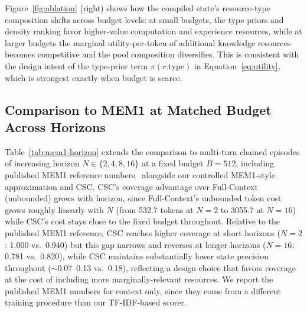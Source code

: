 \documentclass{article}
\begin{document}
Figure~\ref{fig:ablation} (right) shows how the compiled state's resource-type composition shifts across budget levels: at small budgets, the type priors and density ranking favor higher-value computation and experience resources, while at larger budgets the marginal utility-per-token of additional knowledge resources becomes competitive and the pool composition diversifies. This is consistent with the design intent of the type-prior term $\pi(r.\text{type})$ in Equation~\eqref{eq:utility}, which is strongest exactly when budget is scarce.

\subsection{Comparison to MEM1 at Matched Budget Across Horizons}
Table~\ref{tab:mem1-horizon} extends the comparison to multi-turn chained episodes of increasing horizon $N \in \{2, 4, 8, 16\}$ at a fixed budget $B=512$, including published MEM1 reference numbers~\citep{zhou2025mem1} alongside our controlled MEM1-style approximation and CSC. CSC's coverage advantage over Full-Context (unbounded) grows with horizon, since Full-Context's unbounded token cost grows roughly linearly with $N$ (from 532.7 tokens at $N=2$ to 3055.7 at $N=16$) while CSC's cost stays close to the fixed budget throughout. Relative to the published MEM1 reference, CSC reaches higher coverage at short horizons ($N=2$: 1.000 vs.\ 0.940) but this gap narrows and reverses at longer horizons ($N=16$: 0.781 vs.\ 0.820), while CSC maintains substantially lower state precision throughout ($\sim$0.07--0.13 vs.\ 0.18), reflecting a design choice that favors coverage at the cost of including more marginally-relevant resources. We report the published MEM1 numbers for context only, since they come from a different training procedure than our TF-IDF-based scorer.
\end{document}
